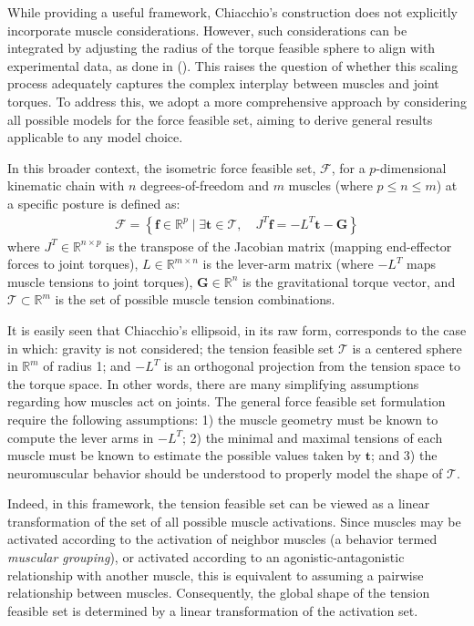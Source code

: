 While providing a useful framework, Chiacchio's construction does not explicitly incorporate muscle considerations. However, such considerations can be integrated by adjusting the radius of the torque feasible sphere to align with experimental data, as done in (\cite{rezzougUpperLimbIsometricForce2021b}). This raises the question of whether this scaling process adequately captures the complex interplay between muscles and joint torques. To address this, we adopt a more comprehensive approach by considering all possible models for the force feasible set, aiming to derive general results applicable to any model choice.

In this broader context, the isometric force feasible set, $\mathcal{F}$, for a $p$-dimensional kinematic chain with $n$ degrees-of-freedom and $m$ muscles (where $p \leq n \leq m$) at a specific posture is defined as:
\begin{align*}
 \mathcal{F} = \left\{ \mathbf{f}\in\mathbb{R}^p \mid \exists \mathbf{t}\in \mathcal{T},\quad J^T\mathbf{f} = -L^T\mathbf{t} - \mathbf{G}\right\}
\end{align*}
where $J^T\in\mathbb{R}^{n \times p}$ is the transpose of the Jacobian matrix (mapping end-effector forces to joint torques), $L\in\mathbb{R}^{m \times n}$ is the lever-arm matrix (where $-L^T$ maps muscle tensions to joint torques), $\mathbf{G}\in\mathbb{R}^n$ is the gravitational torque vector, and $\mathcal{T}\subset \mathbb{R}^m$ is the set of possible muscle tension combinations.

It is easily seen that Chiacchio's ellipsoid, in its raw form, corresponds to the case in which: gravity is not considered; the tension feasible set $\mathcal{T}$ is a centered sphere in $\mathbb{R}^m$ of radius 1; and $-L^T$ is an orthogonal projection from the tension space to the torque space. In other words, there are many simplifying assumptions regarding how muscles act on joints. The general force feasible set formulation require the following assumptions: 1) the muscle geometry must be known to compute the lever arms in $-L^T$; 2) the minimal and maximal tensions of each muscle must be known to estimate the possible values taken by $\mathbf{t}$; and 3) the neuromuscular behavior should be understood to properly model the shape of $\mathcal{T}$. 

Indeed, in this framework, the tension feasible set can be viewed as a linear transformation of the set of all possible muscle activations. Since muscles may be activated according to the activation of neighbor muscles (a behavior termed \emph{muscular grouping}), or activated according to an agonistic-antagonistic relationship with another muscle, this is equivalent to assuming a pairwise relationship between muscles. Consequently, the global shape of the tension feasible set is determined by a linear transformation of the activation set.  

